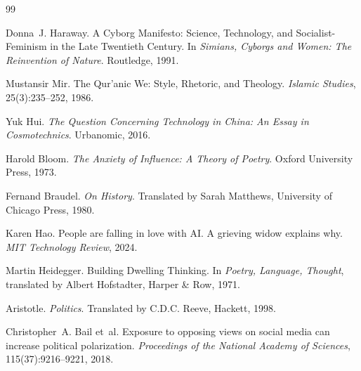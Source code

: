 \documentclass[12pt,a4paper]{article}
\begin{document}
\bigskip


\begin{thebibliography}{99}

Donna~J. Haraway.
\newblock A Cyborg Manifesto: Science, Technology, and Socialist-Feminism in the Late Twentieth Century.
\newblock In \emph{Simians, Cyborgs and Women: The Reinvention of Nature}. Routledge, 1991.

Mustansir Mir.
\newblock The Qur'anic We: Style, Rhetoric, and Theology.
\newblock \emph{Islamic Studies}, 25(3):235--252, 1986.

Yuk Hui.
\newblock \emph{The Question Concerning Technology in China: An Essay in Cosmotechnics}.
\newblock Urbanomic, 2016.

Harold Bloom.
\newblock \emph{The Anxiety of Influence: A Theory of Poetry}.
\newblock Oxford University Press, 1973.

Fernand Braudel.
\newblock \emph{On History}.
\newblock Translated by Sarah Matthews, University of Chicago Press, 1980.

Karen Hao.
\newblock People are falling in love with AI\@. A grieving widow explains why.
\newblock \emph{MIT Technology Review}, 2024.

Martin Heidegger.
\newblock Building Dwelling Thinking.
\newblock In \emph{Poetry, Language, Thought}, translated by Albert Hofstadter, Harper \& Row, 1971.

Aristotle.
\newblock \emph{Politics}.
\newblock Translated by C.D.C. Reeve, Hackett, 1998.

Christopher~A. Bail et~al.
\newblock Exposure to opposing views on social media can increase political polarization.
\newblock \emph{Proceedings of the National Academy of Sciences}, 115(37):9216--9221, 2018.

\end{thebibliography}
\end{document}
